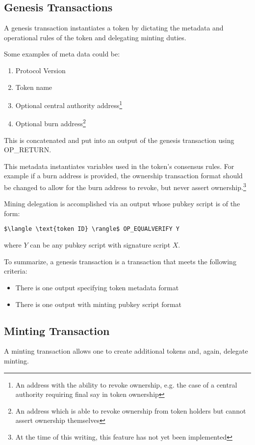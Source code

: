 \documentclass[9pt,oneside]{amsart}
\begin{document}
\begin{multicols}{2}
\subsection{Genesis Transactions}\label{subsec:gentrans}
A genesis transaction instantiates a token by dictating the metadata and operational rules of the token and delegating minting duties.

Some examples of meta data could be:
\begin{enumerate}
	\item Protocol Version
    \item Token name
	\item Optional central authority address\footnote{An address with the ability to revoke ownership, e.g. the case of a central authority requiring final say in token ownership}
    \item Optional burn address\footnote{An address which is able to revoke ownership from token holders but cannot assert ownership themselves}
\end{enumerate}
This is concatenated and put into an output of the genesis transaction using OP\_RETURN.

This metadata instantiates variables used in the token's consensus rules. For example if a burn address is provided, the ownership transaction format should be changed to allow for the burn address to revoke, but never assert ownership.\footnote{At the time of this writing, this feature has not yet been implemented}

Mining delegation is accomplished via an output whose pubkey script is of the form:

\begin{lstlisting}[title={\textbf{Minting PubKey Script}}]
$\langle \text{token ID} \rangle$ OP_EQUALVERIFY Y
\end{lstlisting}
where $Y$ can be any pubkey script with signature script $X$. 

To summarize, a genesis transaction is a transaction that meets the following criteria:
\begin{itemize}
    \item There is one output specifying token metadata format
    \item There is one output with minting pubkey script format
\end{itemize}

\subsection{Minting Transaction}
A minting transaction allows one to create additional tokens and, again, delegate minting.


\end{multicols}
\end{document}

